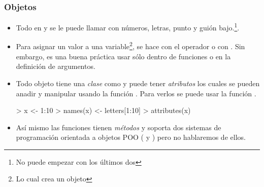 \begin{frame}
  \frametitle{Objetos}
  \begin{itemize}
  \item Todo en  y se le puede llamar con n\'umeros, letras, punto y gui\'on bajo.\footnote{No puede empezar con los \'ultimos dos}.
  \item Para asignar un valor a una variable\footnote{Lo cual crea un objeto}, se hace con el operador \pl{<-} o con \pl{=}. Sin embargo, es una buena pr\'actica usar \pl{=} s\'olo dentro de funciones o en la definici\'on de argumentos.
  \item Todo objeto tiene una \emph{clase} como  y puede tener \emph{atributos} los cuales se pueden anadir y manipular usando la funci\'on . Para verlos se puede usar la funci\'on .
\begin{Schunk}
\begin{Sinput}
> x <- 1:10
> names(x) <- letters[1:10]
> attributes(x)
\end{Sinput}
\end{Schunk}
  \item As\'i mismo las funciones tienen \emph{m\'etodos} y  soporta dos sistemas de programaci\'on orientada a objetos POO ( y ) pero no hablaremos de ellos.
  \end{itemize}
\end{frame}

